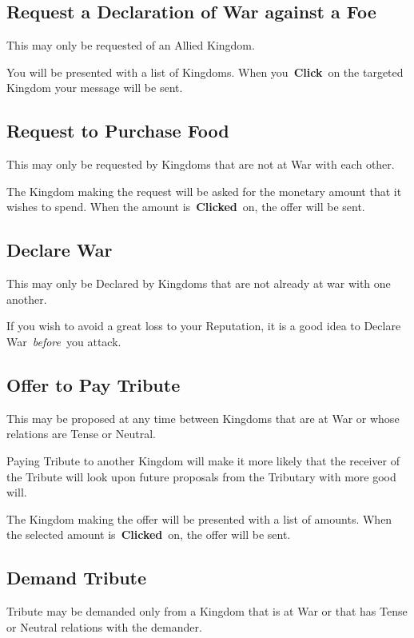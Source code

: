 \subsection{Request a Declaration of War against a Foe}

This may only be requested of an Allied Kingdom.

You will be presented with a list of Kingdoms. When you \textbf{Click} on the targeted Kingdom your message will be sent.

\subsection{Request to Purchase Food}

This may only be requested by Kingdoms that are not at War with each other.

The Kingdom making the request will be asked for the monetary amount that it wishes to spend. When the amount is \textbf{Clicked} on, the offer will be sent.

\subsection{Declare War}

This may only be Declared by Kingdoms that are not already at war with one another.

If you wish to avoid a great loss to your Reputation, it is a good idea to Declare War \textit{before} you attack.

\subsection{Offer to Pay Tribute}

This may be proposed at any time between Kingdoms that are at War or whose relations are Tense or Neutral.

Paying Tribute to another Kingdom will make it more likely that the receiver of the Tribute will look upon future proposals from the Tributary with more good will.

The Kingdom making the offer will be presented with a list of amounts. When the selected amount is \textbf{Clicked} on, the offer will be sent.

\subsection{Demand Tribute}

Tribute may be demanded only from a Kingdom that is at War or that has Tense or Neutral relations with the demander.

